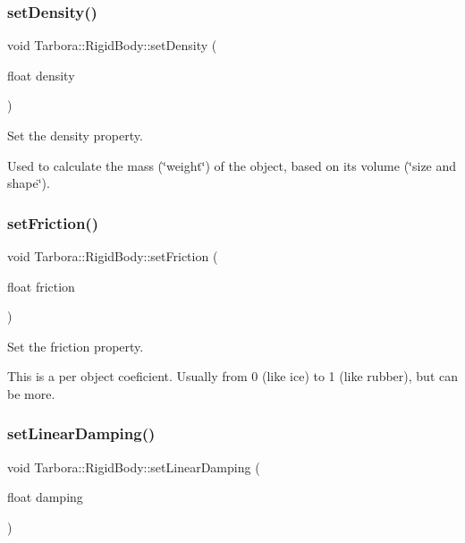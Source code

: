 \subsubsection{\texorpdfstring{set\+Density()}{setDensity()}}
{\footnotesize\ttfamily void Tarbora\+::\+Rigid\+Body\+::set\+Density (\begin{DoxyParamCaption}\item[{float}]{density }\end{DoxyParamCaption})\hspace{0.3cm}{\ttfamily [inline]}}



Set the density property. 

Used to calculate the mass (\char`\"{}weight\char`\"{}) of the object, based on its volume (\char`\"{}size and shape\char`\"{}). \mbox{\label{classTarbora_1_1RigidBody_ada1b1247d514beb54c11a5baa4a065cf}} 
\subsubsection{\texorpdfstring{set\+Friction()}{setFriction()}}
{\footnotesize\ttfamily void Tarbora\+::\+Rigid\+Body\+::set\+Friction (\begin{DoxyParamCaption}\item[{float}]{friction }\end{DoxyParamCaption})\hspace{0.3cm}{\ttfamily [inline]}}



Set the friction property. 

This is a per object coeficient. Usually from 0 (like ice) to 1 (like rubber), but can be more. \mbox{\label{classTarbora_1_1RigidBody_ae1ccef4eb62dd20d709e28ff012bff84}} 
\subsubsection{\texorpdfstring{set\+Linear\+Damping()}{setLinearDamping()}}
{\footnotesize\ttfamily void Tarbora\+::\+Rigid\+Body\+::set\+Linear\+Damping (\begin{DoxyParamCaption}\item[{float}]{damping }\end{DoxyParamCaption})}



